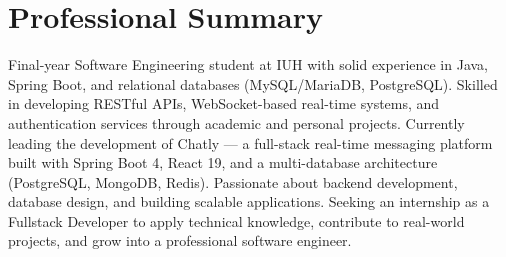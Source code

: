 \section{Professional Summary}

\vspace{4pt}
Final-year Software Engineering student at IUH with solid experience in Java, Spring Boot, and relational databases (MySQL/MariaDB, PostgreSQL). Skilled in developing RESTful APIs, WebSocket-based real-time systems, and authentication services through academic and personal projects. Currently leading the development of Chatly --- a full-stack real-time messaging platform built with Spring Boot 4, React 19, and a multi-database architecture (PostgreSQL, MongoDB, Redis). Passionate about backend development, database design, and building scalable applications. Seeking an internship as a Fullstack Developer to apply technical knowledge, contribute to real-world projects, and grow into a professional software engineer.
